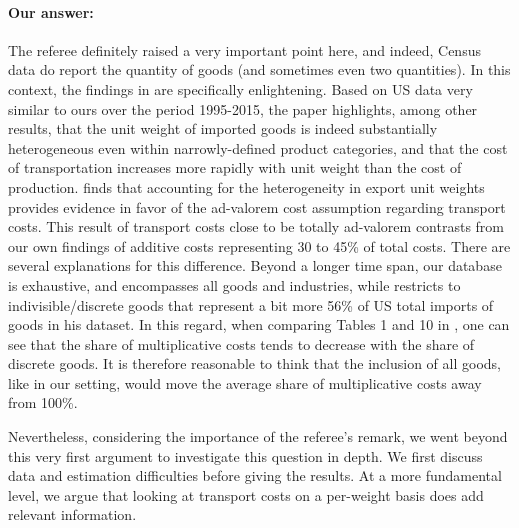 \documentclass[a4paper,11pt]{article}
\begin{document}
\paragraph{Our answer:}
\noindent %
The referee definitely raised a very important point here, and indeed, Census data do report the quantity of goods (and sometimes even two quantities).
In this context, the findings in \cite{Lashkaripour_JIE2020} are specifically enlightening.
Based on US data very similar to ours over the period 1995-2015, the paper highlights, among other results, that the unit weight of imported goods is indeed substantially heterogeneous even within narrowly-defined product categories, and that the cost of transportation increases more rapidly with unit weight than the cost of production. \cite{Lashkaripour_JIE2020} finds that accounting for the heterogeneity in export unit weights provides evidence in favor of the ad-valorem cost assumption regarding transport costs.
This result of transport costs close to be totally ad-valorem contrasts from our own findings of additive costs representing 30 to 45\% of total costs. There are several explanations for this difference. Beyond a longer time span, our database is exhaustive, and encompasses all goods and industries, while \citet{Lashkaripour_JIE2020} restricts to indivisible/discrete goods that represent a bit more 56\% of US total imports of goods in his dataset. In this regard, when comparing Tables 1 and 10 in \citet{Lashkaripour_JIE2020}, one can see that the share of multiplicative costs tends to decrease with the share of discrete goods. It is therefore reasonable to think that the inclusion of all goods, like in our setting, would move the average share of multiplicative costs away from 100\%.

Nevertheless, considering the importance of the referee's remark, we went beyond this very first argument to investigate this question in depth. We first discuss data and estimation difficulties before giving the results. At a more fundamental level, we argue that looking at transport costs on a per-weight basis does add relevant information.

\end{document}

